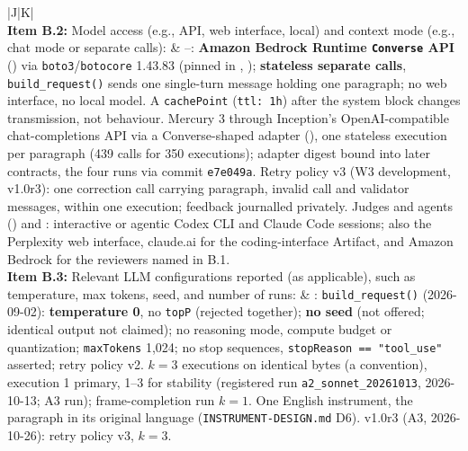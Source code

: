 \documentclass[12pt]{article}
\begin{document}
{\begin{longtable}{|J|K|}
\\
\hline
\textbf{Item B.2:} Model access (e.g., API, web interface, local) and context mode (e.g., chat mode or separate calls):
&
--: \textbf{Amazon Bedrock Runtime \texttt{Converse} API} () via \texttt{boto3}/\texttt{botocore} 1.43.83 (pinned in , ); \textbf{stateless separate calls}, \texttt{build\_request()} sends one single-turn message holding one paragraph; no web interface, no local model. A \texttt{cachePoint} (\texttt{ttl: 1h}) after the system block changes transmission, not behaviour. Mercury 3 through Inception's OpenAI-compatible chat-completions API via a Converse-shaped adapter (), one stateless execution per paragraph (439 calls for 350 executions); adapter digest bound into later contracts, the four runs via commit \texttt{e7e049a}. Retry policy v3 (W3 development, v1.0r3): one correction call carrying paragraph, invalid call and validator messages, within one execution; feedback journalled privately. Judges and agents () and : interactive or agentic Codex CLI and Claude Code sessions; also the Perplexity web interface, claude.ai for the coding-interface Artifact, and Amazon Bedrock for the reviewers named in B.1.
\\
\hline
\textbf{Item B.3:} Relevant LLM configurations reported (as applicable), such as temperature, max tokens, seed, and number of runs:
&
: \texttt{build\_request()} (2026-09-02): \textbf{temperature 0}, no \texttt{topP} (rejected together); \textbf{no seed} (not offered; identical output not claimed); no reasoning mode, compute budget or quantization; \texttt{maxTokens} 1{,}024; no stop sequences, \texttt{stopReason == "tool\_use"} asserted; retry policy v2. \textbf{$k = 3$} executions on identical bytes (a convention), execution 1 primary, 1--3 for stability (registered run \texttt{a2\_sonnet\_20261013}, 2026-10-13; A3 run); frame-completion run $k = 1$. One English instrument, the paragraph in its original language (\texttt{INSTRUMENT-DESIGN.md} D6). v1.0r3 (A3, 2026-10-26): retry policy v3, $k = 3$.
\\[2pt]

\end{longtable}}
\end{document}
